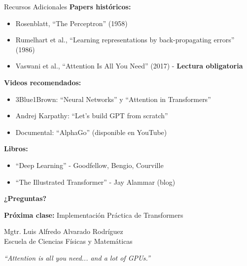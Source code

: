 \documentclass[aspectratio=169]{beamer}
\begin{document}
\begin{frame}{Recursos Adicionales}
    \textbf{Papers históricos:}
    \begin{itemize}
        \item Rosenblatt, ``The Perceptron'' (1958)
        \item Rumelhart et al., ``Learning representations by back-propagating errors'' (1986)
        \item Vaswani et al., ``Attention Is All You Need'' (2017) - \textbf{Lectura obligatoria}
    \end{itemize}
    
    \vspace{0.3cm}
    \textbf{Videos recomendados:}
    \begin{itemize}
        \item 3Blue1Brown: ``Neural Networks'' y ``Attention in Transformers''
        \item Andrej Karpathy: ``Let's build GPT from scratch''
        \item Documental: ``AlphaGo'' (disponible en YouTube)
    \end{itemize}
    
    \vspace{0.3cm}
    \textbf{Libros:}
    \begin{itemize}
        \item ``Deep Learning'' - Goodfellow, Bengio, Courville
        \item ``The Illustrated Transformer'' - Jay Alammar (blog)
    \end{itemize}
\end{frame}

\begin{frame}
    \centering
    \Huge \textbf{¿Preguntas?}
    
    \vspace{0.8cm}
    \large
    \textbf{Próxima clase:} Implementación Práctica de Transformers
    
    \vspace{0.5cm}
    \normalsize
    Mgtr. Luis Alfredo Alvarado Rodríguez\\
    \small Escuela de Ciencias Físicas y Matemáticas
    
    \vspace{0.5cm}
    \footnotesize
    \textit{``Attention is all you need... and a lot of GPUs.''}
\end{frame}
\end{document}
